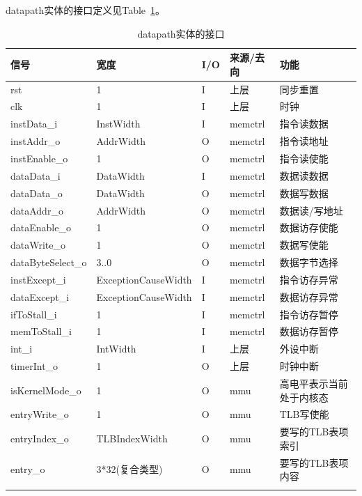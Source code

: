 \documentclass{article}
\begin{document}
\begin{spacing}{1.4}
datapath实体的接口定义见Table~\ref{tb:datapath-interface}。
\begin{longtable}{l|l|l|l|p{5cm}}
\hline
\textbf{信号}&\textbf{宽度}&\textbf{I/O}&\textbf{来源/去向}&\textbf{功能} \\
\hline \endhead rst            & 1                      & I     & 上层          & 同步重置 \\
\hline clk                     & 1                      & I     & 上层          & 时钟 \\
\hline instData\_i             & InstWidth              & I     & memctrl       & 指令读数据 \\
\hline instAddr\_o             & AddrWidth              & O     & memctrl       & 指令读地址 \\
\hline instEnable\_o           & 1                      & O     & memctrl       & 指令读使能 \\
\hline dataData\_i             & DataWidth              & I     & memctrl       & 数据读数据 \\
\hline dataData\_o             & DataWidth              & O     & memctrl       & 数据写数据 \\
\hline dataAddr\_o             & AddrWidth              & O     & memctrl       & 数据读/写地址 \\
\hline dataEnable\_o           & 1                      & O     & memctrl       & 数据访存使能 \\
\hline dataWrite\_o            & 1                      & O     & memctrl       & 数据写使能 \\
\hline dataByteSelect\_o       & 3..0                   & O     & memctrl       & 数据字节选择 \\
\hline instExcept\_i           & ExceptionCauseWidth    & I     & memctrl       & 指令访存异常 \\
\hline dataExcept\_i           & ExceptionCauseWidth    & I     & memctrl       & 数据访存异常 \\
\hline ifToStall\_i            & 1                      & I     & memctrl       & 指令访存暂停 \\
\hline memToStall\_i           & 1                      & I     & memctrl       & 数据访存暂停 \\
\hline int\_i                  & IntWidth               & I     & 上层          & 外设中断 \\
\hline timerInt\_o             & 1                      & O     & 上层          & 时钟中断 \\
\hline isKernelMode\_o         & 1                      & O     & mmu           & 高电平表示当前处于内核态 \\
\hline entryWrite\_o           & 1                      & O     & mmu           & TLB写使能 \\
\hline entryIndex\_o           & TLBIndexWidth          & O     & mmu           & 要写的TLB表项索引 \\
\hline entry\_o                & 3*32(复合类型)         & O     & mmu           & 要写的TLB表项内容 \\
\hline
\caption{datapath实体的接口}
\label{tb:datapath-interface}
\end{longtable}


\end{spacing}
\end{document}
